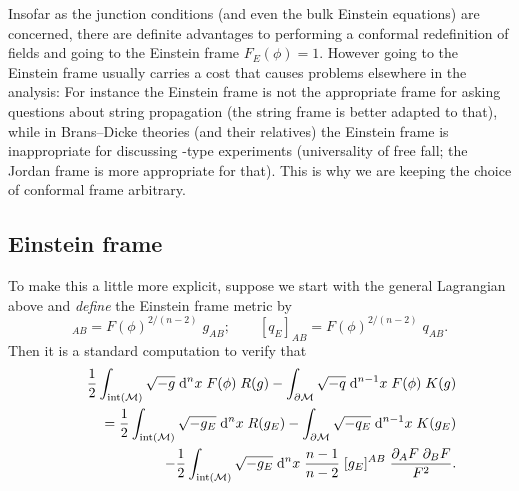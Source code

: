 \documentclass[a4paper,10pt]{article}
\begin{document}
Insofar as the junction conditions (and even the bulk Einstein
equations) are concerned, there are definite advantages to performing
a conformal redefinition of fields and going to the Einstein frame
$F_E(\phi)=1$.  However going to the Einstein frame usually carries a
cost that causes problems elsewhere in the analysis: For instance the
Einstein frame is not the appropriate frame for asking questions about
string propagation (the string frame is better adapted to that), while
in Brans--Dicke theories (and their relatives) the Einstein frame is
inappropriate for discussing \Eotvos-type experiments (universality of
free fall; the Jordan frame is more appropriate for that). This is why
we are keeping the choice of conformal frame arbitrary.



\subsection{Einstein frame}

To make this a little more explicit, suppose we start with the general
Lagrangian above and {\emph{define}} the Einstein frame metric by
%
\begin{equation}
[g_E]_{AB}
= 
F(\phi)^{2/(n-2)} \; g_{AB}; 
\qquad
[q_E]_{AB}
= 
F(\phi)^{2/(n-2)} \; q_{AB}. 
\end{equation}
%
Then it is a standard computation to verify that
%
\begin{eqnarray}
&&{1\over2}\int_{{\rm int}({\mathcal M})} \sqrt{-g} \;{\mathrm d}^n x \; F(\phi) \;  R(g)
-\int_{\partial{\mathcal M}} \sqrt{-q} \;{\mathrm d}^{n-1}x \; F(\phi)\;K(g)
\nonumber\\
&&
\qquad 
=
{1\over2}\int_{{\rm int}({\mathcal M})} \sqrt{-g_E} \;{\mathrm d}^n x \;  R(g_E)
-\int_{\partial{\mathcal M}} \sqrt{-q_E} \;{\mathrm d}^{n-1}x \;K(g_E)
\nonumber\\
&&
\qquad\qquad
-{1\over2}\int_{{\rm int}({\mathcal M})} \sqrt{-g_E} \;{\mathrm d}^n x \; {n-1\over n-2} \;
[g_E]^{AB} \; {\partial_A F \; \partial_B F\over F^2}.
\end{eqnarray}
%
\end{document}
